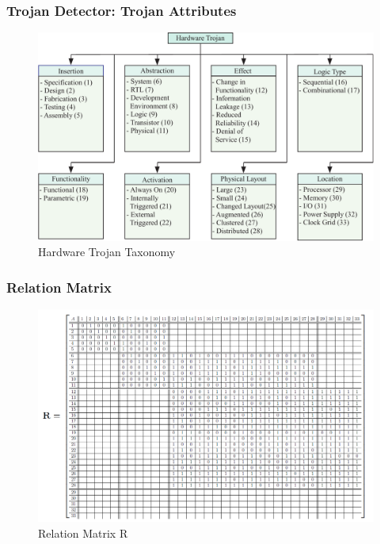 \documentclass{beamer}
\begin{document}
\begin{frame}
	\frametitle{Trojan Detector: Trojan Attributes}
	\begin{figure}
		\centering
		\includegraphics[width=0.7\linewidth]{../NewAutomated_V4/Figures/HW_trojan}
		\caption[Hardware Trojan Taxonomy~\cite{samerAttribute}]{Hardware Trojan Taxonomy~\cite{samerAttribute}}
		\label{fig:HW_trojan}
	\end{figure}
\end{frame}

\begin{frame}
	\frametitle{Relation Matrix}
	\begin{figure}
		\centering
		\includegraphics[width=0.9\linewidth]{figs/R}
		\caption[Relation Matrix R]{Relation Matrix R}
		\label{fig:R}
	\end{figure}
\end{frame}
\end{document}
